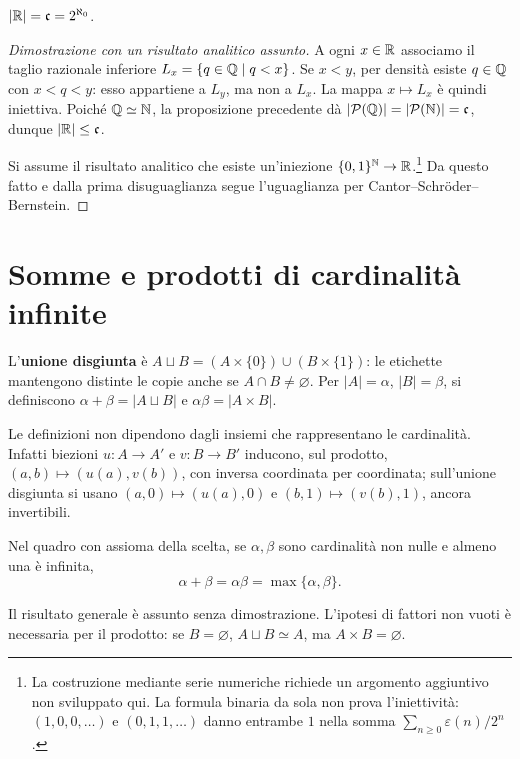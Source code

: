 \begin{teorema}\label{teo:continuo}
$|\mathbb{R}|=\mathfrak c=2^{\aleph_0}$.
\end{teorema}
\begin{proof}[Dimostrazione con un risultato analitico assunto]
 A ogni $x\in\mathbb{R}$ associamo il taglio razionale inferiore $L_x=\{q\in\mathbb{Q}\mid q<x\}$. Se $x<y$, per densità esiste $q\in\mathbb{Q}$ con $x<q<y$: esso appartiene a $L_y$, ma non a $L_x$. La mappa $x\mapsto L_x$ è quindi iniettiva. Poiché $\mathbb{Q}\simeq\mathbb{N}$, la proposizione precedente dà $|\mathcal P(\mathbb{Q})|=|\mathcal P(\mathbb{N})|=\mathfrak c$, dunque $|\mathbb{R}|\le\mathfrak c$.

 Si assume il risultato analitico che esiste un'iniezione $\{0,1\}^{\mathbb{N}}\to\mathbb{R}$.\footnote{La costruzione mediante serie numeriche richiede un argomento aggiuntivo non sviluppato qui. La formula binaria da sola non prova l'iniettività: $(1,0,0,\ldots)$ e $(0,1,1,\ldots)$ danno entrambe $1$ nella somma $\sum_{n\ge0}\varepsilon(n)/2^n$.} Da questo fatto e dalla prima disuguaglianza segue l'uguaglianza per Cantor--Schröder--Bernstein.
\end{proof}

\section{Somme e prodotti di cardinalità infinite}
\begin{definizione}
L'\textbf{unione disgiunta} è $A\sqcup B=(A\times\{0\})\cup(B\times\{1\})$: le etichette mantengono distinte le copie anche se $A\cap B\ne\varnothing$. Per $|A|=\alpha$, $|B|=\beta$, si definiscono $\alpha+\beta=|A\sqcup B|$ e $\alpha\beta=|A\times B|$.
\end{definizione}

Le definizioni non dipendono dagli insiemi che rappresentano le cardinalità. Infatti biezioni $u:A\to A'$ e $v:B\to B'$ inducono, sul prodotto, $(a,b)\mapsto(u(a),v(b))$, con inversa coordinata per coordinata; sull'unione disgiunta si usano $(a,0)\mapsto(u(a),0)$ e $(b,1)\mapsto(v(b),1)$, ancora invertibili.

\begin{teorema}
Nel quadro con assioma della scelta, se $\alpha,\beta$ sono cardinalità non nulle e almeno una è infinita,
\[
\alpha+\beta=\alpha\beta=\max\{\alpha,\beta\}.
\]
\end{teorema}
Il risultato generale è assunto senza dimostrazione. L'ipotesi di fattori non vuoti è necessaria per il prodotto: se $B=\varnothing$, $A\sqcup B\simeq A$, ma $A\times B=\varnothing$.
